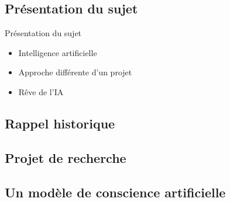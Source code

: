 \subsection{Présentation du sujet}
\begin{frame}{Présentation du sujet}
	\begin{itemize}
		\item Intelligence artificielle
		\pause
		\item Approche différente d'un projet
		\pause
		\item Rêve de l'IA
	\end{itemize}
\end{frame}

\subsection{Rappel historique}


\subsection{Projet de recherche}


\subsection{Un modèle de conscience artificielle}
